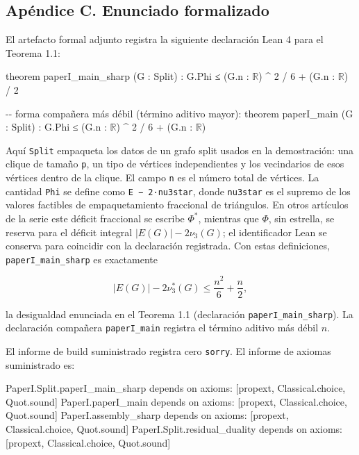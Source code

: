 \documentclass[
  spanish,
  11pt,
  a4paper,
]{article}
\newenvironment{Shaded}{}{}
\newcommand{\NormalTok}[1]{#1}
\begin{document}
\subsection{Apéndice C. Enunciado formalizado}\label{apuxe9ndice-c.-enunciado-formalizado}

El artefacto formal adjunto registra la siguiente declaración Lean 4 para el Teorema 1.1:

\begin{Shaded}
\begin{Highlighting}[]
\NormalTok{theorem paperI\_main\_sharp (G : Split) :}
\NormalTok{    G.Phi ≤ (G.n : \ensuremath{\mathbb{R}}) \^{} 2 / 6 + (G.n : \ensuremath{\mathbb{R}}) / 2}

\NormalTok{{-}{-} forma compañera más débil (término aditivo mayor):}
\NormalTok{theorem paperI\_main (G : Split) :}
\NormalTok{    G.Phi ≤ (G.n : \ensuremath{\mathbb{R}}) \^{} 2 / 6 + (G.n : \ensuremath{\mathbb{R}})}
\end{Highlighting}
\end{Shaded}

Aquí \texttt{Split} empaqueta los datos de un grafo split usados en la demostración: una clique de tamaño \texttt{p}, un tipo de vértices independientes y los vecindarios de esos vértices dentro de la clique. El campo \texttt{n} es el número total de vértices. La cantidad \texttt{Phi} se define como \texttt{\textbar{}E\textbar{}\ −\ 2·nu3star}, donde \texttt{nu3star} es el supremo de los valores factibles de empaquetamiento fraccional de triángulos. En otros artículos de la serie este déficit fraccional se escribe \(\Phi^*\), mientras que \(\Phi\), sin estrella, se reserva para el déficit integral \(|E(G)|-2\nu_3(G)\); el identificador Lean se conserva para coincidir con la declaración registrada. Con estas definiciones, \texttt{paperI\_main\_sharp} es exactamente

\[
|E(G)|-2\nu_3^*(G)\le \frac{n^2}{6}+\frac{n}{2},
\]

la desigualdad enunciada en el Teorema 1.1 (declaración \texttt{paperI\_main\_sharp}). La declaración compañera \texttt{paperI\_main} registra el término aditivo más débil \(n\).

El informe de build suministrado registra cero \texttt{sorry}. El informe de axiomas suministrado es:

\begin{Shaded}
\begin{Highlighting}[]
\NormalTok{PaperI.Split.paperI\_main\_sharp depends on axioms: [propext, Classical.choice, Quot.sound]}
\NormalTok{PaperI.paperI\_main         depends on axioms: [propext, Classical.choice, Quot.sound]}
\NormalTok{PaperI.assembly\_sharp      depends on axioms: [propext, Classical.choice, Quot.sound]}
\NormalTok{PaperI.Split.residual\_duality depends on axioms: [propext, Classical.choice, Quot.sound]}
\end{Highlighting}
\end{Shaded}
\end{document}
